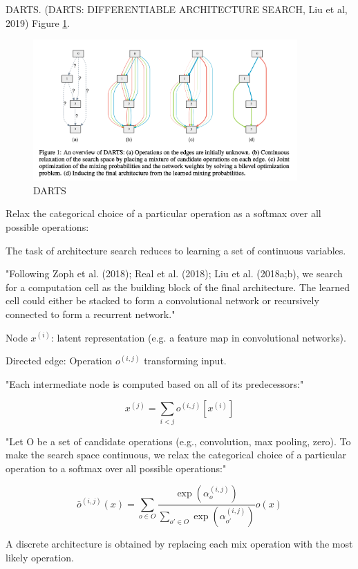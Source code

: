 \documentclass[english]{article}
\begin{document}
\item DARTS. (DARTS: DIFFERENTIABLE ARCHITECTURE SEARCH, Liu et al, 2019)
Figure \ref{darts}.


\begin{figure}[h!]
  \centering
  \includegraphics[width=0.9\textwidth]{DARTS}
  \caption{DARTS}
  \label{darts}
\end{figure}


Relax the categorical choice of a particular operation as a softmax over all possible operations:

\benum 
\item 
The task of architecture search reduces to learning a set of continuous variables.

"Following Zoph et al. (2018); Real et al. (2018); Liu et al. (2018a;b), we search for a computation
cell as the building block of the final architecture. The learned cell could either be stacked to form a
convolutional network or recursively connected to form a recurrent network."

Node $x^{(i)}$: latent representation (e.g. a feature map in convolutional networks).

Directed edge:  Operation $o^{(i,j)}$ transforming input.

"Each intermediate node is computed based on all of its predecessors:"

$$x^{(j)} = \sum_{i<j} o^{(i,j)}[x^{(i)}]$$


"Let O be a set of candidate operations (e.g., convolution, max pooling, zero). To make the search space continuous, we relax
the categorical choice of a particular operation to a softmax over all possible operations:"

$$\bar o^{(i,j)}(x) = \sum_{o\in O} 
\frac{\exp(\alpha_o^{(i,j)})}
{\sum_{o'\in O}\exp(\alpha_{o'}^{(i,j)})}
o(x)$$




\item 
A discrete architecture is obtained by replacing each mix operation  with the most likely operation. 
\end{document}
